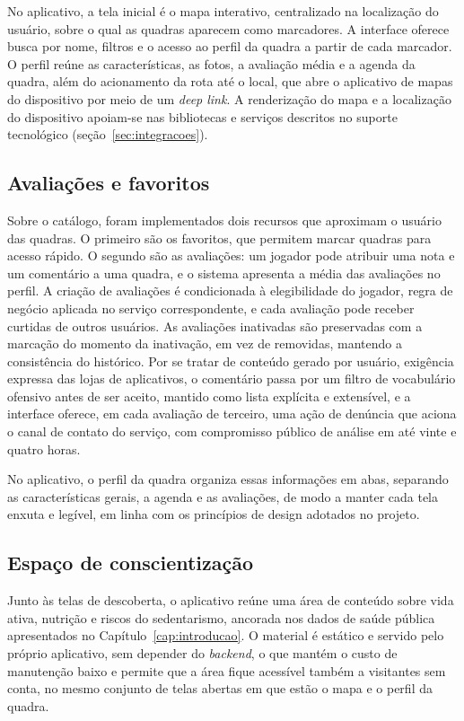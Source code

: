       No aplicativo, a tela inicial é o mapa interativo, centralizado na localização do usuário, sobre o qual as quadras aparecem como marcadores. A interface oferece busca por nome, filtros e o acesso ao perfil da quadra a partir de cada marcador. O perfil reúne as características, as fotos, a avaliação média e a agenda da quadra, além do acionamento da rota até o local, que abre o aplicativo de mapas do dispositivo por meio de um \textit{deep link}. A renderização do mapa e a localização do dispositivo apoiam-se nas bibliotecas e serviços descritos no suporte tecnológico (seção~\ref{sec:integracoes}).

    \subsection{Avaliações e favoritos}
      Sobre o catálogo, foram implementados dois recursos que aproximam o usuário das quadras. O primeiro são os favoritos, que permitem marcar quadras para acesso rápido. O segundo são as avaliações: um jogador pode atribuir uma nota e um comentário a uma quadra, e o sistema apresenta a média das avaliações no perfil. A criação de avaliações é condicionada à elegibilidade do jogador, regra de negócio aplicada no serviço correspondente, e cada avaliação pode receber curtidas de outros usuários. As avaliações inativadas são preservadas com a marcação do momento da inativação, em vez de removidas, mantendo a consistência do histórico. Por se tratar de conteúdo gerado por usuário, exigência expressa das lojas de aplicativos, o comentário passa por um filtro de vocabulário ofensivo antes de ser aceito, mantido como lista explícita e extensível, e a interface oferece, em cada avaliação de terceiro, uma ação de denúncia que aciona o canal de contato do serviço, com compromisso público de análise em até vinte e quatro horas.

      No aplicativo, o perfil da quadra organiza essas informações em abas, separando as características gerais, a agenda e as avaliações, de modo a manter cada tela enxuta e legível, em linha com os princípios de design adotados no projeto.

    \subsection{Espaço de conscientização}
      Junto às telas de descoberta, o aplicativo reúne uma área de conteúdo sobre vida ativa, nutrição e riscos do sedentarismo, ancorada nos dados de saúde pública apresentados no Capítulo~\ref{cap:introducao}. O material é estático e servido pelo próprio aplicativo, sem depender do \textit{backend}, o que mantém o custo de manutenção baixo e permite que a área fique acessível também a visitantes sem conta, no mesmo conjunto de telas abertas em que estão o mapa e o perfil da quadra.

